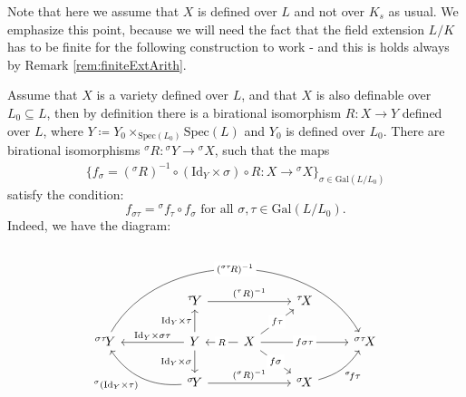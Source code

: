 \documentclass[10pt]{amsart}
\theoremstyle{definition}
\newcommand{\Spe}{ {\mathrm{Spec} } }
\newcommand{\Gal}{{ \mathrm{Gal}}}
\begin{document}
Note that here we assume that $X$ is defined over $L$ and not over $K_s$ as usual. We emphasize this point, because we will need the fact that the field extension $L/K$ has to be finite for the following construction to work - and this is holds always by Remark \ref{rem:finiteExtArith}.

Assume that $X$ is a variety defined over $L$, and that $X$ is also  definable over $L_0 \subseteq L$, then by definition  there is a birational  isomorphism $R\colon X \rightarrow Y $
defined over $L$, where $Y \coloneqq Y_0\times_{\Spe (L_0)} \Spe (L)$ and $Y_0$ is defined over $L_0$. There are birational isomorphisms 
${^\sigma\! R} \colon {^\sigma \!Y} \xrightarrow[]{} {^\sigma \! X} $,
such that the maps
\[
  \{ f_\sigma=({^\sigma\! R})^{-1}\circ
    (\mathrm{Id}_Y \times \sigma) \circ
  R \colon X \rightarrow {^\sigma \! X}\}_{ \sigma \in \Gal(L/L_0)}
\]
satisfy the condition: 
\[
  f_{ \sigma \tau }= { ^\sigma \!f}_\tau \circ 
  f_\sigma \text{ for all } \sigma, \tau \in \Gal(L/L_0). 
\]
Indeed, we have the diagram:

\begin{equation*}
\begin{tikzcd}
  && {^\tau \! Y}  \arrow[rr, "(^{\tau}R)^{-1}"] 
  & & {^{\tau}\! X} 
  \\
 {^{\sigma \tau} \! Y } \arrow[rrrrr,  bend left = 60, "({^{ \sigma \tau} \! R})^{-1}" description]
 &&  Y 
  \arrow[u,"\mathrm{Id}_Y \times \tau"] 
  \arrow[d,"\mathrm{Id}_Y \times \sigma"']
  \arrow[ll,"\mathrm{Id}_Y \times  \sigma \tau"']
  & X \arrow[l, "R" description] \arrow[rr, "f{\sigma \tau}" description] \arrow[ur, "f{\tau}" description] \arrow[dr, "f{\sigma}" description] & &  {^{ \sigma \tau}\! X} 
  \\
  && {^\sigma \! Y} \arrow[ull, bend left, "^{\sigma}(\mathrm{Id}_Y\times \tau)"] \arrow[rr, "(^{\sigma}R)^{-1}"]
  & & {^{\sigma}\! X} \arrow[ur, bend right =  20, "{ ^\sigma \!f}\tau"']
\end{tikzcd}
\end{equation*}
\end{document}
